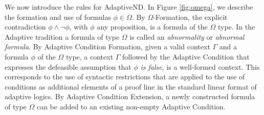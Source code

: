 \documentclass[]{article}
\begin{document}



We now introduce the rules for {\sf AdaptiveND}. In Figure \ref{fig:omega}, we describe the formation and use of formulas $\phi \in \Omega$. By $\Omega${\sf-Formation}, the explicit contradiction $\phi \wedge \neg \phi$, with $\phi$ any proposition, is a formula of the $\Omega$ type. In the Adaptive tradition a formula of type $\Omega$ is called an \textit{abnormality} or \textit{abnormal formula}. By {\sf Adaptive Condition Formation}, given a valid context $\Gamma$ and a formula
$\phi$ of the $\Omega$ type, a context $\Gamma$ followed by the Adaptive Condition that expresses the defeasible assumption that $\phi$ \textit{is false}, is a well-formed context. This corresponds to the use of syntactic restrictions that are applied to the use of conditions as additional elements of a proof line in the standard linear format of adaptive logics. By {\sf Adaptive Condition Extension}, a newly constructed formula of type $\Omega$ can be added to an existing non-empty Adaptive Condition.
\end{document}
